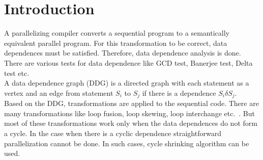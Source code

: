 \chapter{Introduction}

A parallelizing compiler converts a sequential program to a semantically equivalent parallel program. For this transformation to be correct, data dependences must be satisfied. Therefore, data dependence analysis is done. There are various tests for data dependence like GCD test, Banerjee test, Delta test etc.~\cite{allenoptimizing}\\

A data dependence graph (DDG) is a directed graph with each statement as a vertex and an edge from statement $S_i$ to $S_j$ if there is a dependence $S_i \delta S_j$. \\

Based on the DDG, transformations are applied to the sequential code. There are many transformations like loop fusion, loop skewing, loop interchange etc.~\cite{allenoptimizing}. But most of these transformations work only when the data dependences do not form a cycle. In the case when there is a cyclic dependence straightforward parallelization cannot be done. In such cases, cycle shrinking algorithm can be used.\\


